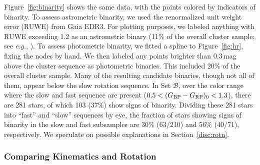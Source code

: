\documentclass[12pt,twocolumn,tighten]{aastex63}
\newcommand{\bpmrpo}{(G_{\rm BP}-G_{\rm RP})_0}
\begin{document}
Figure~\ref{fig:binarity} shows the same data, with the
points colored by indicators of binarity.  To assess astrometric
binarity, we used the renormalized unit weight error (RUWE) from Gaia
EDR3.  For plotting purposes, we labeled anything with RUWE exceeding
1.2 as an astrometric binary (11\% of the overall cluster sample; see
{\it e.g.}, \citealt{belokurov_unresolved_2020}).  To assess
photometric binarity, we fitted a spline to Figure~\ref{fig:hr},
fixing the nodes by hand.  We then labeled any points brighter than
0.3\,mag above the cluster sequence as photometric binaries.  This
included 20\% of the overall cluster sample.  Many of the resulting
candidate binaries, though not all of them, appear below the slow
rotation sequence.  In Set $\mathcal{B}$, over the color range where
the slow and fast sequence are present ($0.5<\bpmrpo<1.3$), there are
281 stars, of which 103 (37\%) show signs of binarity.  Dividing these
281 stars into ``fast'' and ``slow'' sequences by eye,  the fraction
of stars showing signs of binarity in the slow and fast subsamples are
30\% (63/210) and 56\% (40/71), respectively.  We speculate on
possible explanations in Section~\ref{disc:rotn}.


\subsubsection{Comparing Kinematics and Rotation}
\end{document}
